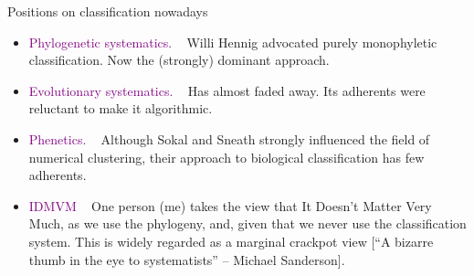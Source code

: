 \documentclass[pdf,bluish,slideColor,colorBG]{prosper}
\begin{document}
% 
% 
% 
% 
\begin{slide}[Replace]{Positions on classification nowadays}

\begin{itemize}
\item \textcolor{purple}{Phylogenetic systematics.} ~ Willi Hennig advocated purely monophyletic
classification.  Now the (strongly) dominant approach.
\item \textcolor{purple}{Evolutionary systematics.} ~ Has almost faded away.  Its adherents were
reluctant to make it algorithmic.
\item \textcolor{purple}{Phenetics.} ~ Although Sokal and Sneath strongly influenced the field of
numerical clustering, their approach to biological classification has few
adherents.
\item \textcolor{purple}{IDMVM} ~ One person (me) takes the view that It Doesn't Matter Very Much,
as we use the phylogeny, and, given that we never use the classification
system.  This is widely regarded as a marginal crackpot view [``A bizarre
thumb in the eye to systematists'' -- Michael Sanderson].
\end{itemize}

\end{slide}
\end{document}
